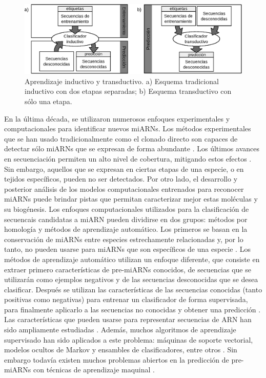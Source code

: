 \begin{figure}[tpb]
	\centering
	\includegraphics[width=\textwidth]{fig/paradigmas.eps}
	\caption[Aprendizaje inductivo vs. transductivo]{Aprendizaje inductivo y transductivo. a) Esquema tradicional inductivo con dos etapas separadas; b)
	Esquema transductivo con sólo una etapa.}
	\label{fig:schemes}
\end{figure}

En la última década, se utilizaron numerosos enfoques experimentales y computacionales para identificar nuevos miARNs. Los métodos experimentales que se han
usado tradicionalmente como el clonado directo son capaces de detectar sólo miARNs que se expresan de forma abundante \citep{kleftogiannis2013where}. Los
últimos avances en secuenciación permiten un alto nivel de cobertura, mitigando estos efectos \citep{an2013mirdeep}. Sin embargo, aquellos que se expresan en
ciertas etapas de una especie, o en tejidos específicos, pueden no ser detectados. Por otro lado, el desarrollo y posterior análisis de los modelos
computacionales entrenados para reconocer miARNs puede brindar pistas que permitan caracterizar mejor estas moléculas y su biogénesis. Los enfoques
computacionales utilizados para la clasificación de secuencais candidatas a miARN pueden dividirse en dos grupos: métodos por homología y métodos de aprendizaje
automático. Los primeros se basan en la conservación de miARNs entre especies estrechamente relacionadas y, por lo tanto, no pueden usarse para miARNs que son
específicos de una especie \citep{ng2007novo}. Los métodos de aprendizaje automático utilizan un enfoque diferente, que consiste en extraer primero
características de pre-miARNs conocidos, de secuencias que se utilizarán como ejemplos negativos y de las secuencias desconocidas que se desea clasificar.
Después se utilizan las características de las secuencias conocidas (tanto positivas como negativas) para entrenar un clasificador de forma supervisada, para
finalmente aplicarlo a las secuencias no conocidas y obtener una predicción \citep{kleftogiannis2013where}. Las características que pueden usarse para
representar secuencias de ARN han sido ampliamente estudiadas \citep{Lopes2014}. Además, muchos algoritmos de aprendizaje supervisado han sido aplicados a este
problema: máquinas de soporte vectorial, modelos ocultos de Markov y ensambles de clasificadores, entre otros \citep{kleftogiannis2013where}. Sin embargo
todavía existen muchos problemas abiertos en la predicción de pre-miARNs con técnicas de aprendizaje maquinal \citep{stegmayer2018predicting}.

